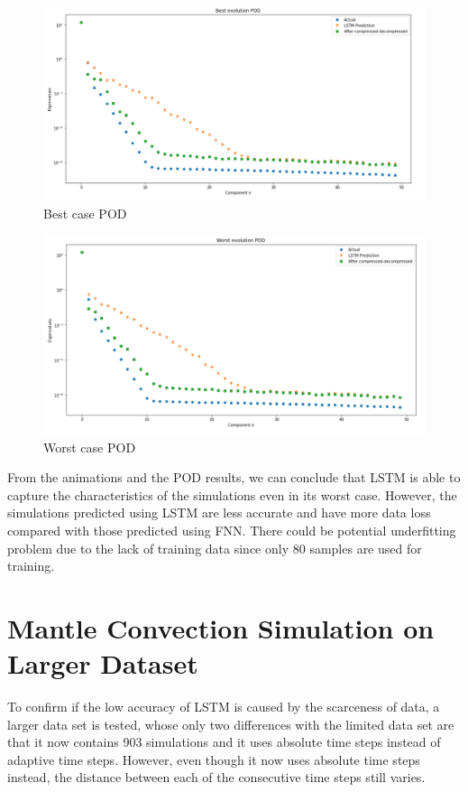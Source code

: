 \begin{figure}[H]
    \caption{Best case POD}
    \includegraphics[scale=0.5]{figures/mantle_convection_images/limited_dataset/LSTM_Best_POD.png}
\end{figure}

\begin{figure}[H]
    \caption{Worst case POD}
    \includegraphics[scale=0.5]{figures/mantle_convection_images/limited_dataset/LSTM_Worst_POD.png}
\end{figure}

From the animations and the POD results, we can conclude that LSTM is able to capture the characteristics of the simulations even in its worst case. However, the simulations predicted using LSTM are less accurate and have more data loss compared with those predicted using FNN. There could be potential underfitting problem due to the lack of training data since only 80 samples are used for training.


\section{Mantle Convection Simulation on Larger Dataset}

To confirm if the low accuracy of LSTM is caused by the scarceness of data, a larger data set is tested, whose only two differences with the limited data set are that it now contains 903 simulations and it uses absolute time steps instead of adaptive time steps. However, even though it now uses absolute time steps instead, the distance between each of the consecutive time steps still varies.

